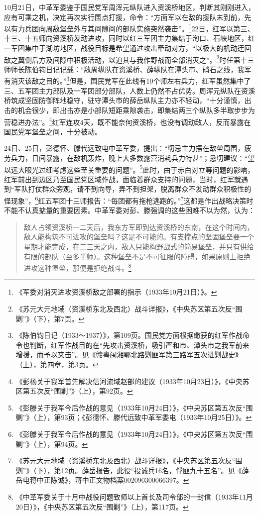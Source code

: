 10月21日，中革军委鉴于国民党军周浑元纵队进入资溪桥地区，判断其刚刚进入，应有可乘之机，决定再次实行围点打援，命令：“方面军以在敌的援队未到前，先以有力兵团向周敌堡垒外与其间隙间的部队实施突然袭击”。\footnote{《军委对消灭进攻资溪桥敌之部署的指示（1933年10月21日）》。}22日，红军以第三、十三、十五师向资溪桥发动进攻，同时以红三军团主力集结于洵口、石峡地区，红一军团集中于湖坊地区，战役目标是希望通过攻击牵动对方，“以极大的机动迂回敌之翼侧后方及间隙中积极活动，以迫其与我作野战而全部消灭之”。\footnote{《苏元大元地域（资溪桥东北及西北）战斗详报》，《中央苏区第五次反“围剿”》（下），第7页。}时任第十三师师长陈伯钧日记记载：“敌周纵队在资溪桥、薛纵队在潭头市、硝石之线，我军有消灭该敌之目的。”\footnote{《陈伯钧日记（1933～1937）》，第109页。国民党方面根据缴获的红军作战命令也判断，红军作战目的在“先攻击资溪桥，吸引严和市、潭头市之我军前来增援，而予以夹击”。见《赣粤闽湘鄂北路剿匪军第三路军五次进剿战史》（上），第四章，第3页。}但是，国民党军在此线有10个师左右兵力，红军虽然集中了三、五军团主力部队及一军团部分部队，人数上仍然不占优势。周浑元纵队在资溪桥筑成坚固防御阵地稳守，驻守潭头市的薛岳纵队主力亦不轻动，“十分谨慎，出击的机会很少，即出击亦是小部队短距乘隙袭击，即集结两三个纵队多半取步步为营稳进办法”。\footnote{《彭杨关于我军首先解决信河流域赵部的建议（1933年10月23日）》，《中央苏区第五次反“围剿”》（上），第92页。}红军连攻4天，既不能奈何资溪桥，也没有调动敌人，反而暴露在国民党军堡垒之间，十分被动。


24日、25日，彭德怀、滕代远致电中革军委，提出：“切忌主力摆在敌垒周围，疲劳兵力，日间暴露，在敌机轰炸，晚上大多数露营消耗兵力特甚”；恳切建议：“望以远大眼光过细考虑这些至关重要的问题”。\footnote{《彭滕关于我军今后作战的意见（1933年10月24日）》，《中央苏区第五次反“围剿”》（上），第93页；《彭德怀、滕代远致中革军委电（1933年10月25日）》。}此时，由于赤白对立等问题的影响，红军前出到边区乃至国民党区域作战，面临着群众支持的问题，当时，红军就遇到“军队打仗群众旁观，请不到向导，弄不到担架，脱离群众不发动群众积极性的怪现象”，\footnote{《彭滕关于我军今后作战的意见（1933年10月24日）》，《中央苏区第五次反“围剿”》（上），第94页。}红五军团十三师报告：“每团都有拖枪逃跑的。”\footnote{《苏元大元地域（资溪桥东北及西北）战斗详报》，《中央苏区第五次反“围剿”》（下），第12页。薛岳报告，此役“投诚兵16名，俘匪九十五名”。见《薛岳电蒋中正陈诚》，蒋中正文物档案002090300066397。}这都是作出战略决策时不能不认真掂量的重要因素。中革军委对彭、滕强调的这些困难不以为然，认为：

\begin{quote}

敌人占领资溪桥一二天后，我东方军即到达资溪桥的东南，在这个时间内，敌人能构筑不可进攻的堡垒吗？这是不可能的。有支撑点的坚固堡垒要一个星期才能完成，在二三天之内，敌人只能构野战式的简易堡垒，并只有供给有限的部队（至多半师）。这种堡垒不是不可征服的障碍，如果原则上拒绝进攻这种堡垒，那便是拒绝战斗。\footnote{《中革军委关于十月中战役问题致师以上首长及司令部的一封信（1933年11月20日）》，《中央苏区第五次反“围剿”》（上），第117页。}
\end{quote}


